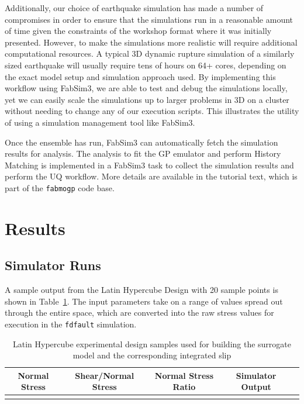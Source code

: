 \documentclass[openacc]{rstransa}%
\begin{document}
Additionally, our choice of earthquake simulation has made a number of compromises in order to
ensure that the simulations run in a reasonable amount of time given the constraints of the
workshop format where it was initially presented. However, to make the simulations more realistic
will require additional computational resources. A typical 3D dynamic rupture simulation of a similarly
sized earthquake will usually require tens of hours on 64+ cores, depending
on the exact model setup and simulation approach used. By implementing this workflow using FabSim3,
we are able to test and debug the simulations locally, yet we can easily scale the simulations
up to larger problems in 3D on a cluster without needing to change any of our execution scripts.
This illustrates the utility of using a simulation management tool like FabSim3.

Once the ensemble has run, FabSim3 can automatically fetch the simulation results for analysis. The
analysis to fit the GP emulator and perform History Matching is implemented in a FabSim3 task to
collect the simulation results and perform the UQ workflow. More details are available in the
tutorial text, which is part of the
\texttt{fabmogp} code base.

\section{Results}

\subsection{Simulator Runs}

A sample output from the Latin Hypercube Design with 20 sample points is shown in Table~\ref{table_lhc}.
The input parameters take on a range of values spread out through the entire space, which are converted
into the raw stress values for execution in the \texttt{fdfault} simulation.

\begin{table}[!h]
\caption{Latin Hypercube experimental design samples used for building the surrogate model and the
corresponding integrated slip}
\label{table_lhc}
\begin{tabular}{ccccc}%
\hline
Normal Stress & Shear/Normal Stress & Normal Stress Ratio & Simulator Output \\
\hline

\\\hline
\end{tabular}
\vspace*{-4pt}
\end{table}%
\end{document}
